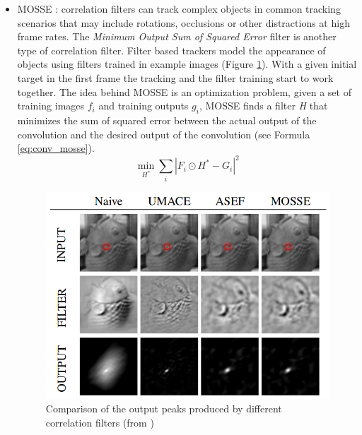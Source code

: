 \begin{itemize}
\item MOSSE \cite{bolme2010visual}: correlation filters can track complex objects in common tracking scenarios that may include rotations, occlusions or other distractions at high frame rates. The \textit{Minimum Output Sum of Squared Error} filter is another type of correlation filter. Filter based trackers model the appearance of objects using filters trained in example images (Figure \ref{fig:mosse}). With a given initial target in the first frame the tracking and the filter training start to work together. The idea behind MOSSE is an optimization problem, given a set of training images $f_i$ and training outputs $g_i$, MOSSE finds a filter \textit{H} that minimizes the sum of squared error between the actual output of the convolution and the desired output of the convolution (see Formula \ref{eq:conv_mosse}).
\begin{equation}
\min_{H^*}\sum_{i}\left|F_i \odot H^* - G_i\right|^2
\label{eq:conv_mosse}
\end{equation}

\begin{figure}[H]
\begin{center}
\includegraphics[scale=0.35]{figures/mosse_filter.png}
\caption{Comparison of the output peaks produced by different correlation filters (from \cite{bolme2010visual})}
\label{fig:mosse}
\end{center}
\end{figure} 


\end{itemize}
